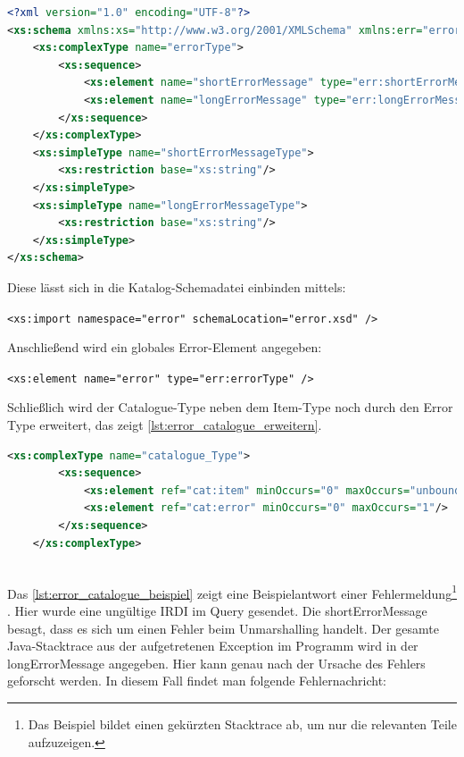  \begin{lstlisting}[caption=Fehlerbehandlung - Error Schemadatei, language=xml, label=lst:error_schema]
<?xml version="1.0" encoding="UTF-8"?>
<xs:schema xmlns:xs="http://www.w3.org/2001/XMLSchema" xmlns:err="error" targetNamespace="error" elementFormDefault="qualified" attributeFormDefault="unqualified">
	<xs:complexType name="errorType">
		<xs:sequence>
			<xs:element name="shortErrorMessage" type="err:shortErrorMessageType" />
			<xs:element name="longErrorMessage" type="err:longErrorMessageType" />
		</xs:sequence>
	</xs:complexType>
	<xs:simpleType name="shortErrorMessageType">
		<xs:restriction base="xs:string"/>
	</xs:simpleType>
	<xs:simpleType name="longErrorMessageType">
		<xs:restriction base="xs:string"/>
	</xs:simpleType>
</xs:schema>
\end{lstlisting}

Diese lässt sich in die Katalog-Schemadatei einbinden mittels:

\lstinline[basicstyle=\ttfamily\small\mdseries]{<xs:import namespace="error" schemaLocation="error.xsd" /> }

Anschließend wird ein globales Error-Element angegeben:

\lstinline[basicstyle=\ttfamily\small\mdseries]{<xs:element name="error" type="err:errorType" />}

Schließlich wird der Catalogue-Type neben dem Item-Type noch durch den Error Type erweitert, das zeigt \autoref{lst:error_catalogue_erweitern}.

 \begin{lstlisting}[caption=Fehlerbehandlung - Catalogue Type erweitern, language=xml, label=lst:error_catalogue_erweitern]
	<xs:complexType name="catalogue_Type">
		<xs:sequence>
			<xs:element ref="cat:item" minOccurs="0" maxOccurs="unbounded"/>
			<xs:element ref="cat:error" minOccurs="0" maxOccurs="1"/>
		</xs:sequence>
	</xs:complexType> 
	
\end{lstlisting} 

Das \autoref{lst:error_catalogue_beispiel} zeigt eine Beispielantwort einer Fehlermeldung\footnote{Das Beispiel bildet einen gekürzten Stacktrace ab, um nur die relevanten Teile aufzuzeigen.} . Hier wurde eine ungültige IRDI im Query gesendet. Die shortErrorMessage besagt, dass es sich um einen Fehler beim Unmarshalling handelt. Der gesamte Java-Stacktrace aus der aufgetretenen Exception im Programm wird in der longErrorMessage angegeben. Hier kann genau nach der Ursache des Fehlers geforscht werden. In diesem Fall findet man folgende Fehlernachricht:

